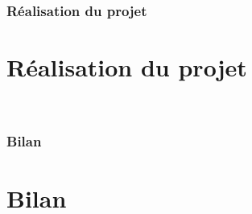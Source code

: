\documentclass[12pt]{beamer}
\begin{document}
	\begin{frame}
		\frametitle{Réalisation du projet}
		\section{Réalisation du projet}
		\
	\end{frame}
	\begin{frame}
		\frametitle{Bilan}
		\section{Bilan}
	\end{frame}
\end{document}
